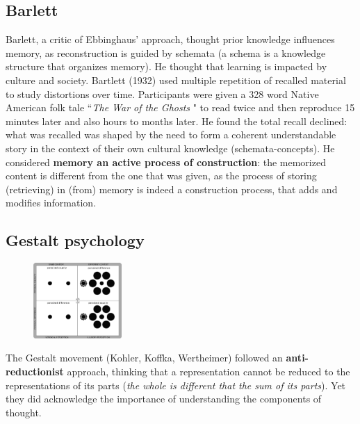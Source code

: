 \subsection{Barlett}
Barlett, a critic of Ebbinghaus' approach, thought prior knowledge influences memory, as reconstruction is guided by schemata (a schema is a knowledge structure that organizes memory). He thought that learning is impacted by culture and society.
Bartlett (1932) used multiple repetition of recalled material to study distortions over time. Participants were given a 328 word Native American folk tale ``\textit{The War of the Ghosts} \notet" to read twice and then reproduce 15 minutes later and also hours to months later. He found the total recall declined: what was recalled was shaped by the need to form a coherent understandable story in the context of their own cultural knowledge (schemata-concepts). He considered \textbf{memory an active process of construction}: the memorized content is different from the one that was given, as the process of storing (retrieving) in (from) memory is indeed a construction process, that adds and modifies information.


\subsection{Gestalt psychology}
\begin{figure}
  \centering
  \includegraphics[width=0.3\textwidth]{images/gestalt_2.png}
  \caption{}
  \label{fig:gestalt_2}
\end{figure}

The Gestalt movement (Kohler, Koffka, Wertheimer) followed an 
\textbf{anti-reductionist} approach, thinking that a representation cannot be reduced to the representations of its parts (\textit{the whole is different that the sum of its parts}). Yet they did acknowledge the importance of understanding the components of thought.\\

